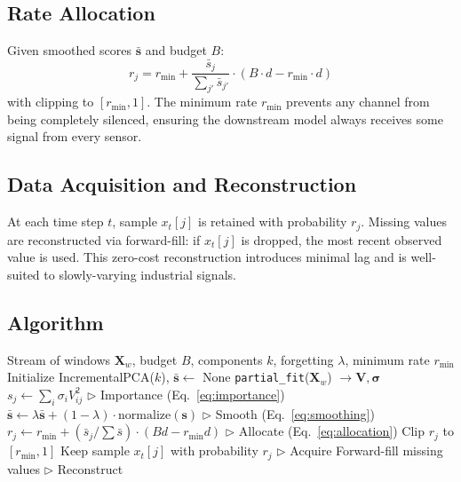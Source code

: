\documentclass[journal]{IEEEtran}
\begin{document}
\subsection{Rate Allocation}

Given smoothed scores $\bar{\mathbf{s}}$ and budget $B$:
\begin{equation}
r_j = r_{\min} + \frac{\bar{s}_j}{\sum_{j'} \bar{s}_{j'}} \cdot (B \cdot d - r_{\min} \cdot d)
\label{eq:allocation}
\end{equation}
with clipping to $[r_{\min}, 1]$. The minimum rate $r_{\min}$ prevents any channel from being completely silenced, ensuring the downstream model always receives some signal from every sensor.

\subsection{Data Acquisition and Reconstruction}

At each time step $t$, sample $x_t[j]$ is retained with probability $r_j$. Missing values are reconstructed via forward-fill: if $x_t[j]$ is dropped, the most recent observed value is used. This zero-cost reconstruction introduces minimal lag and is well-suited to slowly-varying industrial signals.

\subsection{Algorithm}

\begin{algorithm}[t]
\caption{PCA-Triage}
\label{alg:pcatriage}
\begin{algorithmic}[1]
\REQUIRE Stream of windows $\mathbf{X}_w$, budget $B$, components $k$, forgetting $\lambda$, minimum rate $r_{\min}$
\STATE Initialize IncrementalPCA($k$), $\bar{\mathbf{s}} \gets$ None
  \STATE \texttt{partial\_fit}($\mathbf{X}_w$) $\to \mathbf{V}, \boldsymbol{\sigma}$
  \STATE $s_j \gets \sum_i \sigma_i V_{ij}^2$ \hfill $\triangleright$ Importance (Eq.~\ref{eq:importance})
  \STATE $\bar{\mathbf{s}} \gets \lambda \bar{\mathbf{s}} + (1-\lambda) \cdot \text{normalize}(\mathbf{s})$ \hfill $\triangleright$ Smooth (Eq.~\ref{eq:smoothing})
  \STATE $r_j \gets r_{\min} + (\bar{s}_j / \sum \bar{s}) \cdot (Bd - r_{\min} d)$ \hfill $\triangleright$ Allocate (Eq.~\ref{eq:allocation})
  \STATE Clip $r_j$ to $[r_{\min}, 1]$
  \STATE Keep sample $x_t[j]$ with probability $r_j$ \hfill $\triangleright$ Acquire
  \STATE Forward-fill missing values \hfill $\triangleright$ Reconstruct
\ENDFOR
\end{algorithmic}
\end{algorithm}
\end{document}
